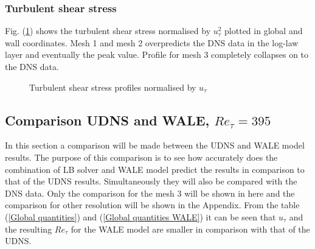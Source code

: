 \subsubsection{Turbulent shear stress}
Fig. (\ref{uvrms wale}) shows the turbulent shear stress normalised by $u_\tau^2$ plotted in global and wall coordinates. Mesh 1 and mesh 2 overpredicts the DNS data in the log-law layer and eventually the peak value. Profile for mesh 3 completely collapses on to the DNS data.
%
\begin{figure}[h!]
\begin{minipage}[b]{0.5\textwidth}
\end{minipage}
%
\begin{minipage}[b]{0.5\textwidth}
\end{minipage}
\caption{Turbulent shear stress profiles normalised by $u_\tau$}
\label{uvrms wale}
\end{figure}

\subsection{Comparison UDNS and WALE, $Re_\tau = 395$}

In this section a comparison will be made between the UDNS and WALE model results. The purpose of this comparison is to see how accurately does the combination of LB solver and WALE model predict the results in comparison to that of the UDNS results. Simultaneously they will also be compared with the DNS data. Only the comparison for the mesh 3 will be shown in here and the comparison for other resolution will be shown in the Appendix. From the table (\ref{Global quantities}) and (\ref{Global quantities WALE}) it can be seen that $u_\tau$ and the resulting $Re_\tau$ for the WALE model are smaller in comparison with that of the UDNS.

